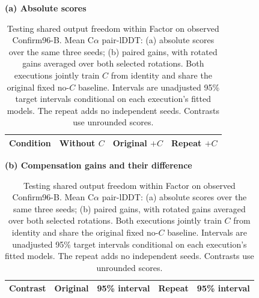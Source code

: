 \begin{table}[t]\centering\footnotesize
\caption{Testing shared output freedom within Factor on observed Confirm96-B. Mean C$\alpha$
pair-lDDT: (a) absolute scores over the same three seeds; (b) paired gains,
with rotated gains averaged over both selected rotations. Both executions
jointly train $C$ from identity and share the original fixed no-$C$ baseline.
Intervals are unadjusted 95\% target intervals conditional on each execution's
fitted models. The repeat adds no independent seeds. Contrasts use unrounded scores.}
\label{tab:e2_absolute}\label{tab:e2_repeat_comparison}
\textbf{(a) Absolute scores}\par\smallskip
\begin{tabular}{lrrr}\toprule
Condition & Without $C$ & Original $+C$ & Repeat $+C$ \\\midrule

\end{tabular}
\par\medskip\textbf{(b) Compensation gains and their difference}\par\smallskip
\setlength{\tabcolsep}{4pt}
\begin{tabular}{lrrrr}\toprule
Contrast & Original & 95\% interval & Repeat & 95\% interval \\\midrule

\end{tabular}\end{table}
